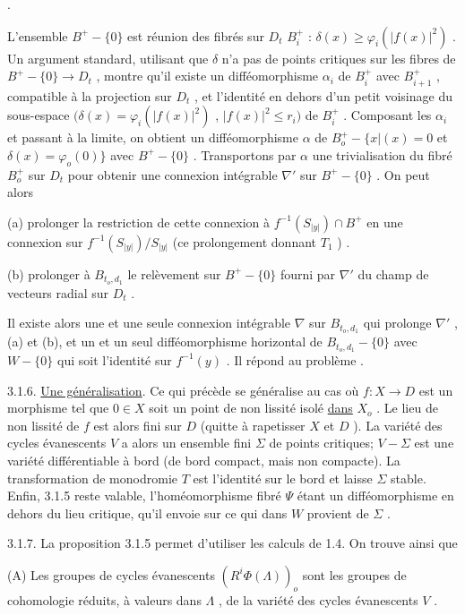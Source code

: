 .

L'ensemble $B^+ - \{0\}$ est réunion des fibrés sur $D_t$ $B_i^+$ : $\delta(x) \geq \varphi_i(|f(x)|^2)$ . Un argument standard, utilisant que $\delta$ n'a pas de points critiques sur les fibres de $B^+ - \{0\} \longrightarrow D_t$ , montre qu'il existe un difféomorphisme $\alpha_i$ de $B_i^+$ avec $B_{i+1}^+$ , compatible à la projection sur $D_t$ , et l'identité en dehors d'un petit voisinage du sous-espace
$(\delta(x) = \varphi_i(|f(x)|^2)$ , $|f(x)|^2 \leq r_i)$ de $B_i^+$ . Composant les $\alpha_i$ et passant à la limite, on obtient un difféomorphisme $\alpha$ de $B_o^+ - \{x | (x) = 0$ et $\delta(x) = \varphi_o(0)\}$ avec $B^+ - \{0\}$ . Transportons par $\alpha$ une trivialisation du fibré $B_o^+$ sur $D_t$ pour obtenir une connexion intégrable $\nabla'$ sur $B^+ - \{0\}$ . On peut alors

(a) prolonger la restriction de cette connexion à $f^{-1}(S_{|y|}) \cap B^+$ en une connexion sur $f^{-1}(S_{|y|}) / S_{|y|}$ (ce prolongement donnant $T_1$ ) .

(b) prolonger à $B_{t_o,d_1}$ le relèvement sur $B^+ - \{0\}$ fourni par $\nabla'$ du champ de vecteurs radial sur $D_t$ .

Il existe alors une et une seule connexion intégrable $\nabla$ sur $B_{t_o,d_1}$ qui prolonge $\nabla'$ , (a) et (b), et un et un seul difféomorphisme horizontal de $B_{t_o,d_1} - \{0\}$ avec $W - \{0\}$ qui soit l'identité sur $f^{-1}(y)$ . Il répond au problème .

3.1.6. \underline{Une généralisation}. Ce qui précède se généralise au cas où $f : X \to D$ est un morphisme tel que $0 \in X$ soit un point de non lissité isolé \underline{dans} $X_o$ . Le lieu de non lissité de $f$ est alors fini sur $D$ (quitte à rapetisser $X$ et $D$ ). La variété des cycles évanescents $V$ a alors un ensemble fini $\Sigma$ de points critiques; $V - \Sigma$ est une variété différentiable à bord (de bord compact, mais non compacte). La transformation de monodromie $T$ est l'identité sur le bord et laisse $\Sigma$ stable. Enfin, 3.1.5 reste valable, l'homéomorphisme fibré $\Psi$ étant un difféomorphisme en dehors du lieu critique, qu'il envoie sur ce qui dans $W$ provient de $\Sigma$ .

3.1.7. La proposition 3.1.5 permet d'utiliser les calculs de 1.4. On trouve ainsi que

(A) Les groupes de cycles évanescents $(R^i \Phi(\Lambda))_o$ sont les groupes de cohomologie réduits, à valeurs dans $\Lambda$ , de la variété des cycles évanescents $V$ .

